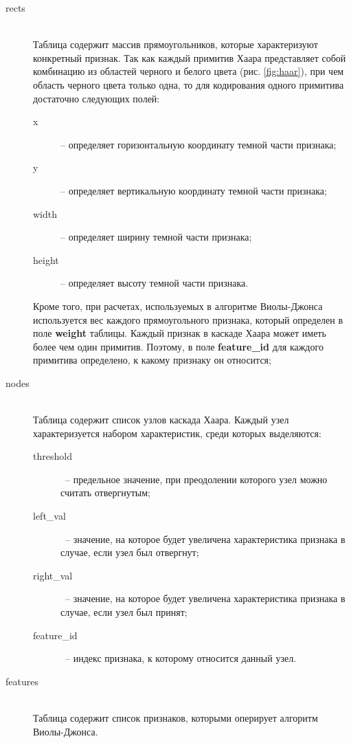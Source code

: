 \begin{description}
    \item[rects] \hfill \\
        Таблица содержит массив прямоугольников, которые характеризуют
        конкретный признак. Так как каждый примитив Хаара представляет собой комбинацию из
        областей черного и белого цвета (рис. \ref{fig:haar}), при чем область черного цвета только одна,
        то для кодирования одного примитива достаточно следующих полей:
        \begin{description}
            \item[x] -- определяет горизонтальную координату темной части признака;
            \item[y] -- определяет вертикальную координату темной части признака;
            \item[width] -- определяет ширину темной части признака;
            \item[height] -- определяет высоту темной части признака.
        \end{description}
        Кроме того, при расчетах, используемых в алгоритме Виолы-Джонса используется
        вес каждого прямоугольного признака, который определен в поле \textbf{weight} таблицы.
        Каждый признак в каскаде Хаара может иметь более чем один примитив. Поэтому, в поле \textbf{feature\_id}
        для каждого примитива определено, к какому признаку он относится;
    \item[nodes] \hfill \\
        Таблица содержит список узлов каскада Хаара. Каждый узел характеризуется набором характеристик, среди
        которых выделяются:
        \begin{description}
            \item[threshold]~-- предельное значение, при преодолении которого узел можно считать отвергнутым;
            \item[left\_val]~-- значение, на которое будет увеличена характеристика признака в случае, если узел был отвергнут;
            \item[right\_val]~-- значение, на которое будет увеличена характеристика признака в случае, если узел был принят; 
            \item[feature\_id]~-- индекс признака, к которому относится данный узел.
        \end{description}
    \item[features] \hfill \\
        Таблица содержит список признаков, которыми оперирует алгоритм Виолы-Джонса.

\end{description}
